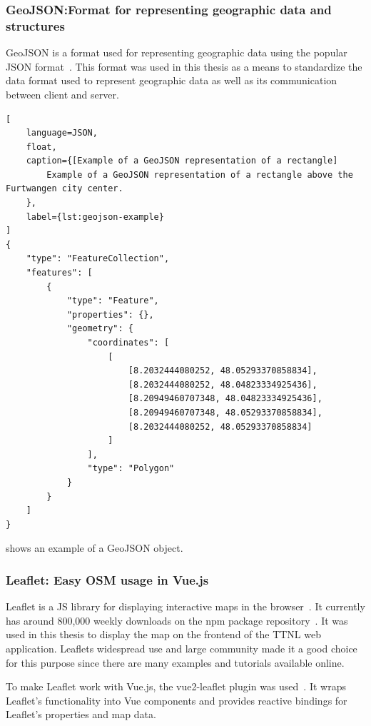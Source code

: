 \subsubsection{GeoJSON:\@ Format for representing geographic data and structures}\label{sec:geojson}

GeoJSON is a format used for representing geographic data using the popular \ac{JSON} format~\cite{butler_geojson_2016}.
This format was used in this thesis as a means to standardize the data format used to represent geographic data as well as its communication between client and server.

\begin{lstlisting}[
    language=JSON,
    float,
    caption={[Example of a GeoJSON representation of a rectangle]
        Example of a GeoJSON representation of a rectangle above the Furtwangen city center.
    },
    label={lst:geojson-example}
]
{
    "type": "FeatureCollection",
    "features": [
        {
            "type": "Feature",
            "properties": {},
            "geometry": {
                "coordinates": [
                    [
                        [8.2032444080252, 48.05293370858834],
                        [8.2032444080252, 48.04823334925436],
                        [8.20949460707348, 48.04823334925436],
                        [8.20949460707348, 48.05293370858834],
                        [8.2032444080252, 48.05293370858834]
                    ]
                ],
                "type": "Polygon"
            }
        }
    ]
}  
\end{lstlisting}

 shows an example of a GeoJSON object.

\subsubsection{Leaflet: Easy \acl{OSM} usage in Vue.js}\label{sec:leaflet}

Leaflet is a \ac{JS} library for displaying interactive maps in the browser~\cite{volodymyr_agafonkin_leaflet_2023}.
It currently has around 800,000 weekly downloads on the npm package repository~\cite{npm_leaflet_2023}.
It was used in this thesis to display the map on the frontend of the \ac{TTNL} web application.
Leaflets widespread use and large community made it a good choice for this purpose since there are many examples and tutorials available online.

To make Leaflet work with Vue.js, the vue2-leaflet plugin was used~\cite{vue_leaflet_team_vue_nodate}.
It wraps Leaflet's functionality into Vue components and provides reactive bindings for Leaflet's properties and map data.

